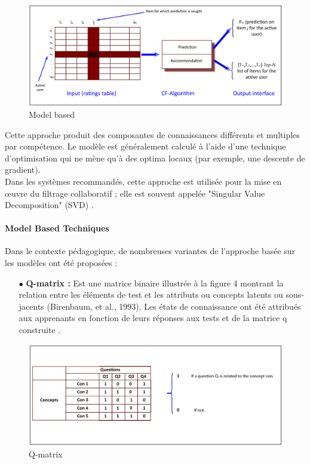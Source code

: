 \begin{figure}[H]
	\begin{center}
		\includegraphics[width=\textwidth]{images/chapitre3/Model_based.png}
	\end{center}
\caption{Model based}
\label{model_based}
\end{figure}

Cette approche produit des composantes de connaissances différents et multiples par compétence. Le modèle est généralement calculé à l'aide d'une technique d'optimisation qui ne mène qu'à des optima locaux (par exemple, une descente de gradient). \\
Dans les systèmes recommandés, cette approche est utilisée pour la mise en œuvre du filtrage collaboratif ; elle est souvent appelée "Singular Value Decomposition" (SVD) \cite{koren2011advances}. 

\paragraph{Model Based Techniques}
Dans le contexte pédagogique, de nombreuses variantes de l'approche basée sur les modèles ont été proposées : \\

\begin{itemize}
    \item[$\bullet$] \textbf{Q-matrix :} Est une matrice binaire illustrée à la figure 4 montrant la relation entre les éléments de test et les attributs ou concepts latents ou sous-jacents (Birenbaum, et al., 1993). Les états de connaissance ont été attribués aux apprenants en fonction de leurs réponses aux tests et de la matrice q construite \cite{barnes2005q}.
\end{itemize}

\begin{figure}[H]
	\begin{center}
		\includegraphics[width=\textwidth]{images/chapitre3/q_matrix.png}
	\end{center}
\caption{Q-matrix}
\label{q_matrix}
\end{figure}

